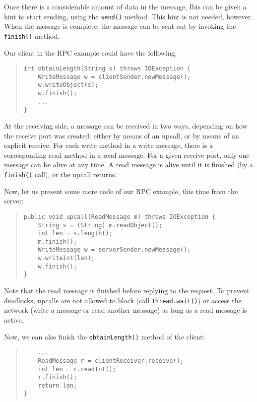 \documentclass[10pt]{article}
\begin{document}
Once there is a considerable amount of data in the message, Ibis
can be given a hint to start sending, using the \texttt{send()}
method. This hint is not needed, however. When the message is
complete, the message can be sent out by invoking the
\texttt{finish()} method.

Our client in the RPC example could have the following:
\begin{quote}
\begin{verbatim}
int obtainLength(String s) throws IOException {
    WriteMessage w = clientSender.newMessage();
    w.writeObject(s);
    w.finish();
    ...
}
\end{verbatim}
\end{quote}

\noindent
At the receiving side, a message can be received in two ways,
depending on how the receive port was created: either by means of an
upcall, or by means of an explicit receive. For each write method
in a write message, there is a corresponding read method in
a read message. For a given receive port, only one message can
be alive at any time. A read message is alive until it is
finished (by a \texttt{finish()} call), or the upcall returns.

Now, let us present some more code of our RPC example, this time
from the server:

\begin{quote}
\begin{verbatim}
public void upcall(ReadMessage m) throws IOException {
    String s = (String) m.readObject();
    int len = s.length();
    m.finish();
    WriteMessage w = serverSender.newMessage();
    w.writeInt(len);
    w.finish();
}
\end{verbatim}
\end{quote}

\noindent
Note that the read message is finished before replying to the
request. To prevent deadlocks, upcalls are not allowed to block
(call \texttt{Thread.wait()}) or access the network (write a message or
read another message) as long as a read message is active.

Now, we can also finish the \texttt{obtainLength()} method of the client:
\begin{quote}
\begin{verbatim}
    ...
    ReadMessage r = clientReceiver.receive();
    int len = r.readInt();
    r.finish();
    return len;
}
\end{verbatim}
\end{quote}
\end{document}

